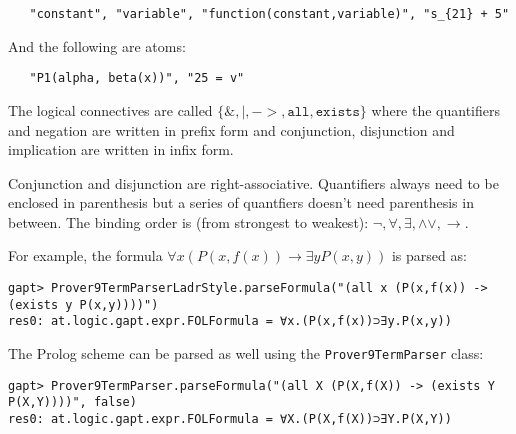 \documentclass[a4paper,11pt]{article}
\renewcommand{\land}{\wedge}
\renewcommand{\lor}{\vee}
\begin{document}
\begin{appendix}
 \begin{lstlisting}
   "constant", "variable", "function(constant,variable)", "s_{21} + 5"
 \end{lstlisting}

And the following are atoms:

 \begin{lstlisting}
   "P1(alpha, beta(x))", "25 = v"
 \end{lstlisting}

The logical connectives are called $\{\mathtt{\&,|,->,all,exists}\}$ where
 the quantifiers and negation are written in prefix form and conjunction,
 disjunction and implication are written in infix form.

Conjunction and disjunction are right-associative. Quantifiers always need to
 be enclosed in parenthesis but a series of quantfiers doesn't need parenthesis
 in between. The binding order is (from strongest to weakest):
 $\mathtt{\neg,\forall,\exists,\land\lor,\rightarrow}$.


For example, the formula $\forall x (P(x,f(x)) \rightarrow \exists y P(x,y))$
 is parsed as:

 \begin{lstlisting}
gapt> Prover9TermParserLadrStyle.parseFormula("(all x (P(x,f(x)) -> (exists y P(x,y))))")
res0: at.logic.gapt.expr.FOLFormula = ∀x.(P(x,f(x))⊃∃y.P(x,y))
 \end{lstlisting}

The Prolog scheme can be parsed as well using the \texttt{Prover9TermParser}
class:

 \begin{lstlisting}
gapt> Prover9TermParser.parseFormula("(all X (P(X,f(X)) -> (exists Y P(X,Y))))", false)
res0: at.logic.gapt.expr.FOLFormula = ∀X.(P(X,f(X))⊃∃Y.P(X,Y))
 \end{lstlisting}




\end{appendix}

\vfill
\pagebreak



\end{document}
